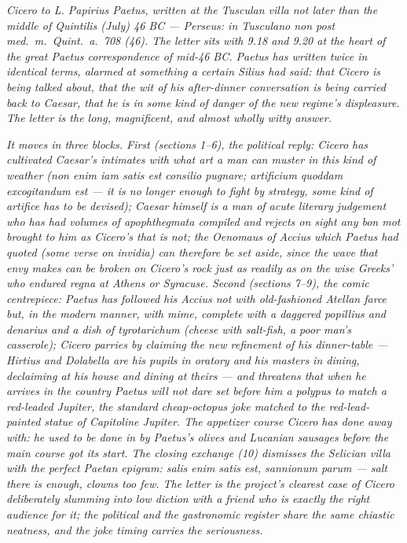 
\textit{Cicero to L. Papirius Paetus, written at the Tusculan villa
not later than the middle of Quintilis (July) 46 BC --- Perseus:
\textit{in Tusculano non post med.~m.~Quint.~a.~708 (46)}. The letter
sits with 9.18 and 9.20 at the heart of the great Paetus correspondence
of mid-46 BC. Paetus has written twice in identical terms, alarmed at
something a certain Silius had said: that Cicero is being talked
about, that the wit of his after-dinner conversation is being carried
back to Caesar, that he is in some kind of danger of the new regime's
displeasure. The letter is the long, magnificent, and almost wholly
witty answer.}

\textit{It moves in three blocks. First (sections 1--6), the
political reply: Cicero has cultivated Caesar's intimates with what
\textit{art} a man can muster in this kind of weather (\textit{non
enim iam satis est consilio pugnare; artificium quoddam excogitandum
est} --- it is no longer enough to fight by strategy, some kind of
artifice has to be devised); Caesar himself is a man of acute literary
judgement who has had volumes of \textit{apophthegmata} compiled and
rejects on sight any \textit{bon mot} brought to him as Cicero's that
is not; the \textit{Oenomaus} of Accius which Paetus had quoted (some
verse on \textit{invidia}) can therefore be set aside, since the wave
that envy makes can be broken on Cicero's rock just as readily as on
the wise Greeks' who endured \textit{regna} at Athens or Syracuse.
Second (sections 7--9), the comic centrepiece: Paetus has followed
his Accius not with old-fashioned Atellan farce but, in the modern
manner, with mime, complete with a daggered \textit{popillius} and
\textit{denarius} and a dish of \textit{tyrotarichum} (cheese with
salt-fish, a poor man's casserole); Cicero parries by claiming the
new refinement of his dinner-table --- Hirtius and Dolabella are his
pupils in oratory and his masters in dining, declaiming at his house
and dining at theirs --- and threatens that when he arrives in the
country Paetus will not dare set before him \textit{a polypus to
match a red-leaded Jupiter}, the standard cheap-octopus joke
matched to the red-lead-painted statue of Capitoline Jupiter. The
appetizer course Cicero has done away with: he used to be done in
by Paetus's olives and Lucanian sausages before the main course got
its start. The closing exchange (10) dismisses the Selician villa
with the perfect Paetan epigram: \textit{salis enim satis est,
sannionum parum} --- salt there is enough, clowns too few. The
letter is the project's clearest case of Cicero deliberately
slumming into low diction with a friend who is exactly the right
audience for it; the political and the gastronomic register share
the same chiastic neatness, and the joke timing carries the
seriousness.}
